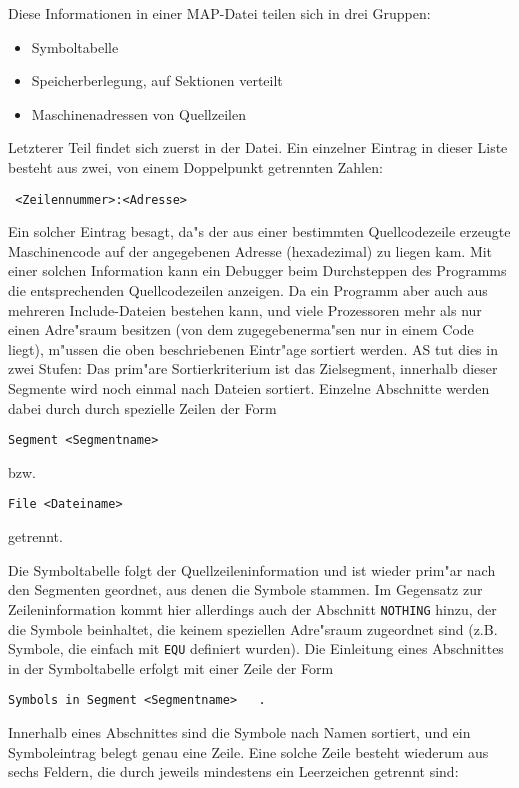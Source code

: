 \documentclass[12pt,a4paper,twoside]{report}
\newcommand{\tty}[1]{{\tt #1}}
\begin{document}
Diese Informationen in einer MAP-Datei teilen sich in drei Gruppen:
\begin{itemize}
\item{Symboltabelle}
\item{Speicherberlegung, auf Sektionen verteilt}
\item{Maschinenadressen von Quellzeilen}
\end{itemize}
Letzterer Teil findet sich zuerst in der Datei.  Ein einzelner
Eintrag in dieser Liste besteht aus zwei, von einem Doppelpunkt
getrennten Zahlen:
\begin{verbatim}
 <Zeilennummer>:<Adresse>
\end{verbatim}
Ein solcher Eintrag besagt, da"s der aus einer bestimmten
Quellcodezeile erzeugte Maschinencode auf der angegebenen Adresse
(hexadezimal) zu liegen kam.  Mit einer solchen Information kann ein
Debugger beim Durchsteppen des Programms die entsprechenden
Quellcodezeilen anzeigen.  Da ein Programm aber auch aus mehreren
Include-Dateien bestehen kann, und viele Prozessoren mehr als nur
einen Adre"sraum besitzen (von dem zugegebenerma"sen nur in einem Code
liegt), m"ussen die oben beschriebenen Eintr"age sortiert werden.  AS
tut dies in zwei Stufen: Das prim"are Sortierkriterium ist das
Zielsegment, innerhalb dieser Segmente wird noch einmal nach Dateien
sortiert.  Einzelne Abschnitte werden dabei durch durch spezielle
Zeilen der Form
\begin{verbatim}
Segment <Segmentname>
\end{verbatim}
bzw.
\begin{verbatim}
File <Dateiname>
\end{verbatim}
getrennt.

Die Symboltabelle folgt der Quellzeileninformation und ist wieder
prim"ar nach den Segmenten geordnet, aus denen die Symbole stammen.
Im Gegensatz zur Zeileninformation kommt hier allerdings auch der
Abschnitt \tty{NOTHING} hinzu, der die Symbole beinhaltet, die keinem
speziellen Adre"sraum zugeordnet sind (z.B. Symbole, die einfach mit
\tty{EQU} definiert wurden).  Die Einleitung eines Abschnittes in der
Symboltabelle erfolgt mit einer Zeile der Form
\begin{verbatim}
Symbols in Segment <Segmentname>   .
\end{verbatim}
Innerhalb eines Abschnittes sind die Symbole nach Namen sortiert, und
ein Symboleintrag belegt genau eine Zeile.  Eine solche Zeile besteht
wiederum aus sechs Feldern, die durch jeweils mindestens ein Leerzeichen
getrennt sind:
\end{document}
